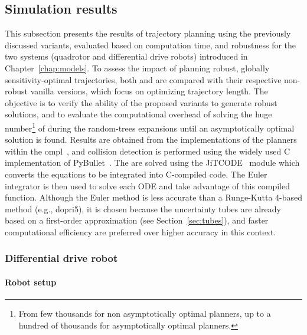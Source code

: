 \subsection{Simulation results}\label{sec:samp_simu}

This subsection presents the results of trajectory planning using the previously discussed variants, evaluated based on computation time, and robustness for the two systems (quadrotor and differential drive robots) introduced in Chapter~\ref{chap:models}.
To assess the impact of planning robust, globally sensitivity-optimal trajectories, both  and  are compared with their respective non-robust vanilla versions, which focus on optimizing trajectory length.
The objective is to verify the ability of the proposed variants to generate robust solutions, and to evaluate the computational overhead of solving the huge number\footnote{From few thousands for non asymptotically optimal planners, up to a hundred of thousands for asymptotically optimal planners.} of  during the random-trees expansions until an asymptotically optimal solution is found.
Results are obtained from the implementations of the planners within the \gls{ompl}~\cite{cOMPL}, and collision detection is performed using the widely used C implementation of PyBullet~\cite{cBullet}.
The  are solved using the JiTCODE~\cite{cJit} module which converts the equations to be integrated into C-compiled code.
The Euler integrator is then used to solve each ODE and take advantage of this compiled function.
Although the Euler method is less accurate than a Runge-Kutta 4-based method (e.g., dopri5), it is chosen because the uncertainty tubes are already based on a first-order approximation (see Section~\ref{sec:tubes}), and faster computational efficiency are preferred over higher accuracy in this context.

\subsubsection{Differential drive robot}\label{sec:unic_setup_samp}

\paragraph{Robot setup}

